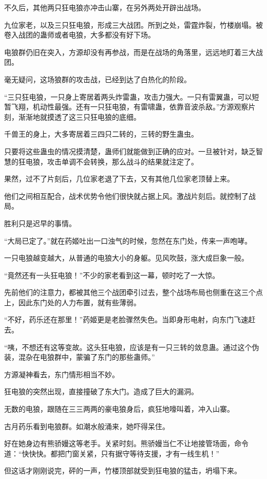 \begin{this_body}
不久后，其他两只狂电狼亦冲击山寨，在另外两处开辟出战场。

九位家老，以及三只狂电狼，形成三大战团。所到之处，雷霆炸裂，竹楼崩塌。被卷入战团的蛊师或者电狼，大多都没有好下场。

电狼群仍旧在突入，方源却没有再参战，而是在战场的角落里，远远地盯着三大战团。

毫无疑问，这场狼群的攻击战，已经到达了白热化的阶段。

“三只狂电狼，一只身上寄居着两头炸雷蛊，攻击力强大。一只有雷翼蛊，可以短暂飞翔，机动性最强。还有一只狂电狼，有雷啸蛊，依靠音波杀敌。”方源观察片刻，渐渐地就摸透了这三只狂电狼的底细。

千兽王的身上，大多寄居着三四只二转的，三转的野生蛊虫。

只要将这些蛊虫的情况摸清楚，蛊师们就能做到正确的应对。一旦被针对，缺乏智慧的狂电狼，攻击单调不会转换，那么战斗的结果就注定了。

果然，过不了片刻后，几位家老退了下去，又有其他几位家老顶替上来。

他们之间相互配合，战术优势令他们很快就占据上风。激战片刻后。就控制了战局。

胜利只是迟早的事情。

“大局已定了。”就在药姬吐出一口浊气的时候，忽然在东门处，传来一声咆哮。

一只电狼越变越大，从普通的电狼大小的身躯。见风吹鼓，涨大成巨象一般。

“竟然还有一头狂电狼！”不少的家老看到这一幕，顿时吃了一大惊。

先前他们的注意力，都被其他三个战团牵引过去，整个战场布局也侧重在这三个点上，因此东门处的人力布置，就有些薄弱。

“不好，药乐还在那里！”药姬更是老脸骤然失色。当即身形电射，向东门飞速赶去。

“咦，不想还有这等变故。这头狂电狼，应该是有一只三转的敛息蛊。通过这个伪装，混杂在电狼群中，蒙骗了东门的那些蛊师。”

方源凝神看去，东门情形相当不妙。

狂电狼的突然出现，直接撞破了东大门。造成了巨大的漏洞。

无数的电狼，跟随在三三两两的豪电狼身后，疯狂地嚎叫着，冲入山寨。

古月药乐看到电狼群。如潮水般涌来，她吓得呆住。

好在她身边有熊骄嫚这等老手。关紧时刻。熊骄嫚当仁不让地接管场面，命令道：“快快快。都把门窗关紧，只有据守等待支援，才有一线生机！”

但这话才刚刚说完，砰的一声，竹楼顶部就受到狂电狼的猛击，坍塌下来。


\end{this_body}
